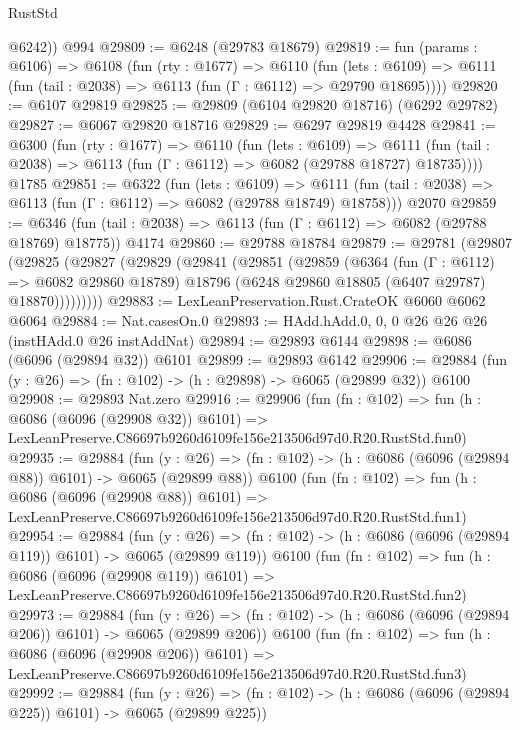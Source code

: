 \begin{lexlean}{RustStd}
\begin{coremodule}
        @6242))
    @994
@29809 := @6248 (@29783 @18679)
@29819 := fun (params : @6106) =>
  @6108
    (fun (rty : @1677) =>
    @6110
      (fun (lets : @6109) =>
      @6111 (fun (tail : @2038) => @6113 (fun (Γ : @6112) => @29790 @18695))))
@29820 := @6107 @29819
@29825 := @29809 (@6104 @29820 @18716) (@6292 @29782)
@29827 := @6067 @29820 @18716
@29829 := @6297 @29819 @4428
@29841 := @6300
    (fun (rty : @1677) =>
    @6110
      (fun (lets : @6109) =>
      @6111 (fun (tail : @2038) => @6113 (fun (Γ : @6112) => @6082 (@29788 @18727) @18735))))
    @1785
@29851 := @6322
    (fun (lets : @6109) =>
    @6111 (fun (tail : @2038) => @6113 (fun (Γ : @6112) => @6082 (@29788 @18749) @18758)))
    @2070
@29859 := @6346
    (fun (tail : @2038) => @6113 (fun (Γ : @6112) => @6082 (@29788 @18769) @18775))
    @4174
@29860 := @29788 @18784
@29879 := @29781
    (@29807
      (@29825
        (@29827
          (@29829
            (@29841
              (@29851
                (@29859
                  (@6364
                    (fun (Γ : @6112) => @6082 @29860 @18789)
                    @18796
                    (@6248 @29860 @18805 (@6407 @29787) @18870)))))))))
@29883 := LexLeanPreservation.Rust.CrateOK @6060 @6062 @6064
@29884 := Nat.casesOn.{0}
@29893 := HAdd.hAdd.{0, 0, 0} @26 @26 @26 (instHAdd.{0} @26 instAddNat)
@29894 := @29893 @6144
@29898 := @6086 (@6096 (@29894 @32)) @6101
@29899 := @29893 @6142
@29906 := @29884 (fun (y : @26) => (fn : @102) -> (h : @29898) -> @6065 (@29899 @32)) @6100
@29908 := @29893 Nat.zero
@29916 := @29906
    (fun (fn : @102) =>
    fun (h : @6086 (@6096 (@29908 @32)) @6101) =>
    LexLeanPreserve.C86697b9260d6109fe156e213506d97d0.R20.RustStd.fun0)
@29935 := @29884
    (fun (y : @26) => (fn : @102) -> (h : @6086 (@6096 (@29894 @88)) @6101) -> @6065 (@29899 @88))
    @6100
    (fun (fn : @102) =>
    fun (h : @6086 (@6096 (@29908 @88)) @6101) =>
    LexLeanPreserve.C86697b9260d6109fe156e213506d97d0.R20.RustStd.fun1)
@29954 := @29884
    (fun (y : @26) => (fn : @102) -> (h : @6086 (@6096 (@29894 @119)) @6101) -> @6065 (@29899 @119))
    @6100
    (fun (fn : @102) =>
    fun (h : @6086 (@6096 (@29908 @119)) @6101) =>
    LexLeanPreserve.C86697b9260d6109fe156e213506d97d0.R20.RustStd.fun2)
@29973 := @29884
    (fun (y : @26) => (fn : @102) -> (h : @6086 (@6096 (@29894 @206)) @6101) -> @6065 (@29899 @206))
    @6100
    (fun (fn : @102) =>
    fun (h : @6086 (@6096 (@29908 @206)) @6101) =>
    LexLeanPreserve.C86697b9260d6109fe156e213506d97d0.R20.RustStd.fun3)
@29992 := @29884
    (fun (y : @26) => (fn : @102) -> (h : @6086 (@6096 (@29894 @225)) @6101) -> @6065 (@29899 @225))

\end{coremodule}
\end{lexlean}
